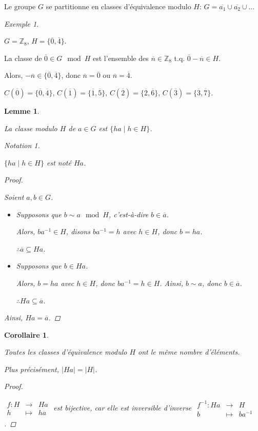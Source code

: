 \documentclass{report}
\newcommand*{\card}[1]{\left| #1 \right|}
\newcommand*{\entiers}{\mathbb{Z}}
\newtheorem*{lem}{Lemme}
\newtheorem*{coro}{Corollaire}
\theoremstyle{definition}
\theoremstyle{remark}
\newtheorem*{exem}{Exemple}
\newtheorem*{nota}{Notation}
\begin{document}
	Le groupe $G$ se partitionne en classes d'\'equivalence modulo $H$: $G = \overline{a_1} \cup \overline{a_2} \cup \dots$
	\begin{exem}~

		$G=\entiers_8$, $H = \{\overline0, \overline4\}$.

		La classe de $\overline0 \in G \mod H$ est l'ensemble des $\overline{n} \in \entiers_8$ t.q. $\overline0 - \overline{n} \in H$.

		Alors, $-\overline{n} \in \{\overline0, \overline4\}$, donc $\overline{n} = \overline0$ ou $\overline{n} = \overline4$.

		$C(\overline0) = \{\overline0,\overline4\}$, $C(\overline1) = \{\overline1,\overline5\}$, $C(\overline2) = \{\overline2,\overline6\}$, $C(\overline3) = \{\overline3,\overline7\}$.
	\end{exem}
	\begin{lem}~

		La classe modulo $H$ de  $a \in G$ est $\{ha \mid h \in H\}$.
		\begin{nota}~

			$\{ha \mid h \in H\}$ est not\'e $Ha$.
		\end{nota}
		\begin{proof}~

			Soient $a,b \in G$.
			\begin{itemize}
				\item[$(\subseteq)$] Supposons que $b \sim a \mod H$, c'est-\`a-dire $b \in \overline{a}$.

				Alors, $ba^{-1} \in H$, disons $ba^{-1} = h$ avec $h \in H$, donc $b=ha$.

				$\therefore \overline{a} \subseteq Ha$.
				\item[$(\supseteq)$] Supposons que $b \in Ha$.

				Alors, $b=ha$ avec $h \in H$, donc $ba^{-1} = h \in H$. Ainsi, $b \sim a$, donc $b \in \overline{a}$.

				$\therefore Ha \subseteq \overline{a}$.
			\end{itemize}

			Ainsi, $Ha = \overline{a}$.
		\end{proof}
	\end{lem}
	\begin{coro}~

		Toutes les classes d'\'equivalence modulo $H$ ont le m\^eme nombre d'\'el\'ements.

		Plus pr\'ecis\'ement, $\card{Ha} = \card{H}$.
		\begin{proof}~

			$\begin{array}{rcl}
				f:H&\to&Ha\\
				h&\mapsto&ha
			\end{array}$ est bijective, car elle est inversible d'inverse
			$\begin{array}{rcl}
				f^{-1}:Ha&\to&H\\
				b&\mapsto&ba^{-1}
			\end{array}$.
		\end{proof}
	\end{coro}
\end{document}
